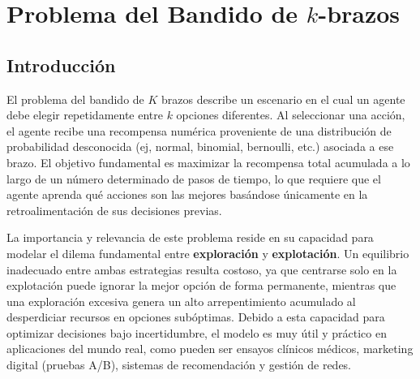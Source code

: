 
\chapter{Problema del Bandido de $k$-brazos}

\section{Introducción}


    El problema del bandido de $K$ brazos describe un escenario en el cual un agente debe elegir repetidamente entre $k$ opciones diferentes. Al seleccionar una acción, el agente recibe una recompensa numérica proveniente de una distribución de probabilidad desconocida (ej, normal, binomial, bernoulli, etc.) asociada a ese brazo. El objetivo fundamental es maximizar la recompensa total acumulada a lo largo de un número determinado de pasos de tiempo, lo que requiere que el agente aprenda qué acciones son las mejores basándose únicamente en la retroalimentación de sus decisiones previas.

    La importancia y relevancia de este problema reside en su capacidad para modelar el dilema fundamental entre \textbf{exploración} y \textbf{explotación}. Un equilibrio inadecuado entre ambas estrategias resulta costoso, ya que centrarse solo en la explotación puede ignorar la mejor opción de forma permanente, mientras que una exploración excesiva genera un alto arrepentimiento acumulado al desperdiciar recursos en opciones subóptimas. Debido a esta capacidad para optimizar decisiones bajo incertidumbre, el modelo es muy útil y práctico en aplicaciones del mundo real, como pueden ser ensayos clínicos médicos, marketing digital (pruebas A/B), sistemas de recomendación y gestión de redes.

